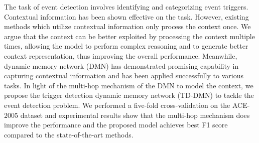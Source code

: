 The task of event detection involves identifying and categorizing event triggers. Contextual information has been shown effective on the task. However, existing methods which utilize contextual information only process the context once. We argue that the context can be better exploited by processing the context multiple times, allowing the model to perform complex reasoning and to generate better context representation, thus improving the overall performance. Meanwhile, dynamic memory network (DMN) has demonstrated promising capability in capturing contextual information and has been applied successfully to various tasks. In light of the multi-hop mechanism of the DMN to model the context, we propose the trigger detection dynamic memory network (TD-DMN) to tackle the event detection problem. We performed a five-fold cross-validation on the ACE-2005 dataset and experimental results show that the multi-hop mechanism does improve the performance and the proposed model achieves best F1 score compared to the state-of-the-art methods.
